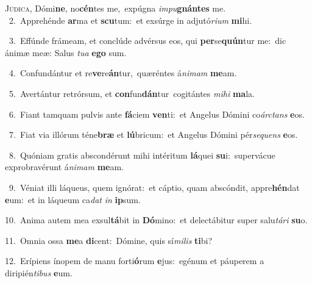 \lettrine{\initial\textcolor{\initialcolor}{J}}{údica,} Dómi\-\textbf{ne}\-, no\-\textbf{cén}\-tes me,~\star expúgna \textit{im}\-\textit{pu}\textbf{gnán}\textbf{tes} me.\\
{\numbfont\textcolor{\numbcolor}{~2.}}~Apprehénde \textbf{ar}\-ma et \textbf{scu}\-tum:~\star et exsúrge in adjutó\-\textit{ri}\-\textit{um} \textbf{mi}\-hi.\par
{\numbfont\textcolor{\numbcolor}{~3.}}~Effúnde frámeam, et conclúde advérsus eos, qui \textbf{per}\-se\-\textbf{quún}\-tur me:~\star dic ánimæ meæ: Salus \textit{tu}\-\textit{a} \textbf{e}\-\textbf{go} sum.\par
{\numbfont\textcolor{\numbcolor}{~4.}}~Confundántur et re\-\textbf{ve}\-re\-\textbf{án}\-tur,~\star quæréntes á\-\textit{ni}\-\textit{mam} \textbf{me}\-am.\par
{\numbfont\textcolor{\numbcolor}{~5.}}~Avertántur retrórsum, et \textbf{con}\-fun\-\textbf{dán}\-tur~\star cogitántes \textit{mi}\-\textit{hi} \textbf{ma}\-la.\par
{\numbfont\textcolor{\numbcolor}{~6.}}~Fiant tamquam pulvis ante \textbf{fá}\-ciem \textbf{ven}\-ti:~\star et Angelus Dómini co\-\textit{árc}\-\textit{tans} \textbf{e}\-os.\par
{\numbfont\textcolor{\numbcolor}{~7.}}~Fiat via illórum téne\textbf{bræ} et \textbf{lú}\-bricum:~\star et Angelus Dómini pér\-\textit{se}\-\textit{quens} \textbf{e}\-os.\par
{\numbfont\textcolor{\numbcolor}{~8.}}~Quóniam gratis abscondérunt mihi intéritum \textbf{lá}\-quei \textbf{su}\-i:~\star supervácue exprobravérunt á\-\textit{ni}\-\textit{mam} \textbf{me}\-am.\par
{\numbfont\textcolor{\numbcolor}{~9.}}~Véniat illi láqueus, quem ignórat:~\dagger et cáptio, quam abscóndit, appre\-\textbf{hén}\-dat \textbf{e}\-um:~\star et in láqueum ca\textit{dat} \textit{in} \textbf{ip}\-sum.\par
{\numbfont\textcolor{\numbcolor}{10.}}~Anima autem mea exsul\-\textbf{tá}\-bit in \textbf{Dó}\-mino:~\star et delectábitur super salu\-\textit{tá}\-\textit{ri} \textbf{su}\-o.\par
{\numbfont\textcolor{\numbcolor}{11.}}~Omnia ossa \textbf{me}\-a \textbf{di}\-cent:~\star Dómine, quis sí\-\textit{mi}\-\textit{lis} \textbf{ti}\-bi?\par
{\numbfont\textcolor{\numbcolor}{12.}}~Erípiens ínopem de manu forti\-\textbf{ó}\-rum \textbf{e}\-jus:~\star egénum et páuperem a diripién\-\textit{ti}\-\textit{bus} \textbf{e}\-um.\par
